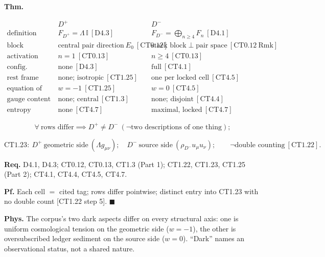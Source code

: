 \begin{theorem}\label{tag:CT4-6}
\textbf{Thm.}

\[
\begin{array}{c|c|c}
& D^+ & D^-\\ \hline
\text{definition} & F_{D^+}=\Lambda\,\mathbb I\ [\mathrm{D4.3}] & F_{D^-}=\bigoplus_{n\ge4}F_n\ [\mathrm{D4.1}]\\
\text{block} & \text{central pair direction}\ E_0\ [\mathrm{CT0.12}] & \text{stack block}\perp\text{pair space}\ [\mathrm{CT0.12\ Rmk}]\\
\text{activation} & n=1\ [\mathrm{CT0.13}] & n\ge4\ [\mathrm{CT0.13}]\\
\text{config.\ dependence} & \text{none}\ [\mathrm{D4.3}] & \text{full}\ [\mathrm{CT4.1}]\\
\text{rest frame} & \text{none; isotropic}\ [\mathrm{CT1.25}] & \text{one per locked cell}\ [\mathrm{CT4.5}]\\
\text{equation of state} & w=-1\ [\mathrm{CT1.25}] & w=0\ [\mathrm{CT4.5}]\\
\text{gauge content} & \text{none; central}\ [\mathrm{CT1.3}] & \text{none; disjoint}\ [\mathrm{CT4.4}]\\
\text{entropy} & \text{none}\ [\mathrm{CT4.7}] & \text{maximal, locked}\ [\mathrm{CT4.7}]
\end{array}
\]

\[
\forall\ \text{rows differ}\implies D^+\ne D^-\ (\neg\text{two descriptions of one thing});
\]

\[
\mathrm{CT1.23}:\ D^+\ \text{geometric side}\ (\Lambda g_{\mu\nu});\quad D^-\ \text{source side}\ (\rho_{D^-}u_\mu u_\nu);\qquad\neg\text{double counting}\ [\mathrm{CT1.22}].
\]

\textbf{Req.} D4.1, D4.3; CT0.12, CT0.13, CT1.3 (Part 1); CT1.22, CT1.23, CT1.25 (Part 2); CT4.1, CT4.4, CT4.5, CT4.7.

\textbf{Pf.} Each cell $=$ cited tag; rows differ pointwise; distinct entry into CT1.23 with no double count [CT1.22 step 5]. $\blacksquare$

\textbf{Phys.} The corpus’s two dark aspects differ on every structural axis: one is uniform cosmological tension on the geometric side ($w=-1$), the other is oversubscribed ledger sediment on the source side ($w=0$). “Dark” names an observational status, not a shared nature.

\end{theorem}

